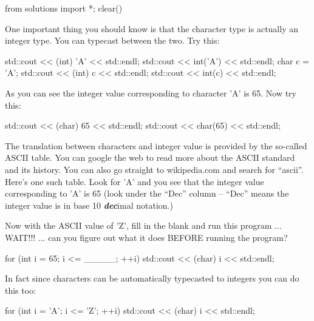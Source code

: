\begin{python0}
from solutions import *; clear()
\end{python0}

One important thing you should know is that the character type is actually an integer type. You can typecast between the two. Try this:

\begin{consolethree}[escapeinside=||]
std::cout << (int) 'A' << std::endl;
std::cout << int('A') << std::endl;
char c = 'A';
std::cout << (int) c << std::endl;
std::cout << int(c) << std::endl;
\end{consolethree}

As you can see the integer value corresponding to character
'A' is 65. Now try this:

\begin{consolethree}[escapeinside=||]
std::cout << (char) 65 << std::endl;
std::cout << char(65) << std::endl;
\end{consolethree}

The translation between characters and integer value is provided by the
so-called ASCII table. You can google the web to read more about the
ASCII standard and its history. You can also go straight to
wikipedia.com and search for ``ascii''. Here's one such
table. Look for 'A' and you see that
the integer value corresponding to 'A'
is 65 (look under the ``Dec'' column -- ``Dec'' means the integer value
is in base 10 \textbf{\textit{dec}}imal notation.)



Now with the ASCII value of 'Z', fill in the blank and run this program ... WAIT!!! ... can you figure out what it does BEFORE running the program?

\begin{consolethree}[escapeinside=||]
for (int i = 65; i <= _____; ++i)
{
    std::cout << (char) i << std::endl;
}
\end{consolethree}

In fact since characters can be automatically typecasted to integers you can do this too:

\begin{consolethree}[escapeinside=||]
for (int i = 'A'; i <= 'Z'; ++i)
{
    std::cout << (char) i << std::endl;
}
\end{consolethree}

